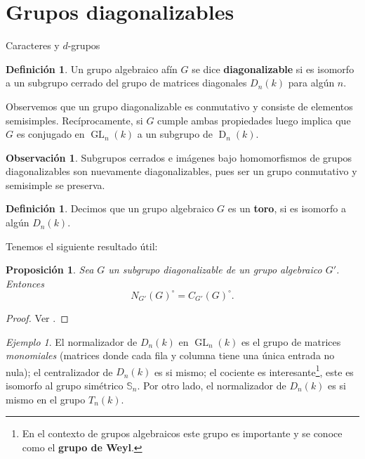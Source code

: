 \documentclass[spanish,12pt]{amsart}
\makeatletter
\renewcommand\subsection{\@startsection{subsection}{2}%
  \z@{.5\linespacing\@plus.7\linespacing}{-.5em}%
  {\normalfont\sffamily}}
\newtheorem{proposition}[theorem]{Proposición}
\theoremstyle{definition}
\newtheorem{definition}[theorem]{Definición}
\newtheorem{obs}[theorem]{Observación}
\theoremstyle{remark}
\newtheorem{example}[theorem]{Ejemplo}
\numberwithin{equation}{section}
\makeatother
\begin{document}
\section{Grupos diagonalizables}

\subsection{Caracteres y $d$-grupos}

\begin{definition}
Un grupo algebraico afín $G$ se dice \textbf{diagonalizable} si es isomorfo a un subgrupo cerrado del grupo de matrices diagonales $D_n (k)$ para algún $n$.
\end{definition}
Observemos que un grupo diagonalizable es conmutativo y consiste de elementos semisimples. Recíprocamente, si $G$ cumple ambas propiedades luego \cite[\S 15.4]{humphreys2012linearAlgebraicGroups} implica que $G$ es conjugado en $\operatorname{GL}_n (k)$ a un subgrupo de $\operatorname{D}_n (k)$.

\begin{obs}
Subgrupos cerrados e imágenes bajo homomorfismos de grupos diagonalizables son nuevamente diagonalizables, pues ser un grupo conmutativo y semisimple se preserva.
\end{obs}

\begin{definition}
Decimos que un grupo algebraico $G$ es un \textbf{toro}, si es isomorfo a algún $D_n (k)$.
\end{definition}


Tenemos el siguiente resultado útil:

\begin{proposition}\label{proposition:si G es un grupo diagonalizable de un grpo algebraico G' entonces la componente de la identidad de N_G' (G) es la componente de la identidad de C_G' (G)}
Sea $G$ un subgrupo diagonalizable de un grupo algebraico $G'$. Entonces
\[
    N_{G'} (G)^{\circ} = C_{G'} (G)^\circ.
\]
\end{proposition}
\begin{proof}
Ver \cite[Corolario 16.3]{humphreys2012linearAlgebraicGroups}.
\end{proof}

\begin{example}
El normalizador de $D_n (k)$ en $\operatorname{GL}_n (k)$ es el grupo de matrices \textit{monomiales} (matrices donde cada fila y columna tiene una única entrada no nula); el centralizador de $D_n (k)$ es si mismo; el cociente es interesante\footnote{En el contexto de grupos algebraicos este grupo es importante y se conoce como el \textbf{grupo de Weyl}.}, este es isomorfo al grupo simétrico $\mathbb{S}_n$. Por otro lado, el normalizador de $D_n (k)$ es si mismo en el grupo $T_n (k)$.
\end{example}
\end{document}
